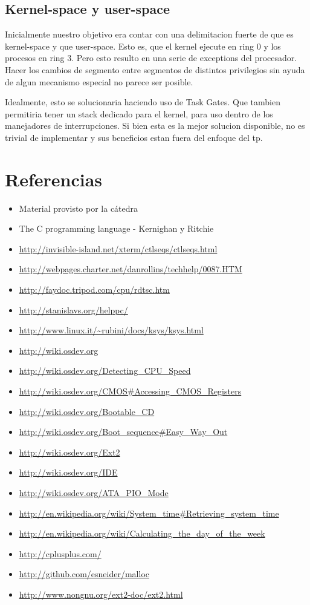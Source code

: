 \documentclass[a4paper,10pt]{article}
\begin{document}
\subsection{Kernel-space y user-space}
Inicialmente nuestro objetivo era contar con una delimitacion fuerte de que es kernel-space y que user-space.
Esto es, que el kernel ejecute en ring 0 y los procesos en ring 3.
Pero esto resulto en una serie de exceptions del procesador.
Hacer los cambios de segmento entre segmentos de distintos privilegios sin ayuda de algun mecanismo especial no parece ser posible.

Idealmente, esto se solucionaria haciendo uso de Task Gates.
Que tambien permitiria tener un stack dedicado para el kernel, para uso dentro de los manejadores de interrupciones.
Si bien esta es la mejor solucion disponible, no es trivial de implementar y sus beneficios estan fuera del enfoque del tp.

\newpage     
\section{Referencias}

\begin{itemize}
  \item Material provisto por la cátedra
  \item The C programming language - Kernighan y Ritchie
  \item \url{http://invisible-island.net/xterm/ctlseqs/ctlseqs.html}
  \item \url{http://webpages.charter.net/danrollins/techhelp/0087.HTM}
  \item \url{http://faydoc.tripod.com/cpu/rdtsc.htm}
  \item \url{http://stanislavs.org/helppc/}
  \item \url{http://www.linux.it/~rubini/docs/ksys/ksys.html}
  \item \url{http://wiki.osdev.org}
  \item \url{http://wiki.osdev.org/Detecting\_CPU\_Speed}
  \item \url{http://wiki.osdev.org/CMOS\#Accessing\_CMOS\_Registers}
  \item \url{http://wiki.osdev.org/Bootable\_CD}
  \item \url{http://wiki.osdev.org/Boot\_sequence\#Easy\_Way\_Out}
  \item \url{http://wiki.osdev.org/Ext2}
  \item \url{http://wiki.osdev.org/IDE}
  \item \url{http://wiki.osdev.org/ATA\_PIO\_Mode}
  \item \url{http://en.wikipedia.org/wiki/System\_time\#Retrieving\_system\_time}
  \item \url{http://en.wikipedia.org/wiki/Calculating\_the\_day\_of\_the\_week}
  \item \url{http://cplusplus.com/}
  \item \url{http://github.com/esneider/malloc}
  \item \url{http://www.nongnu.org/ext2-doc/ext2.html}
\end{itemize}
   
\end{document}
